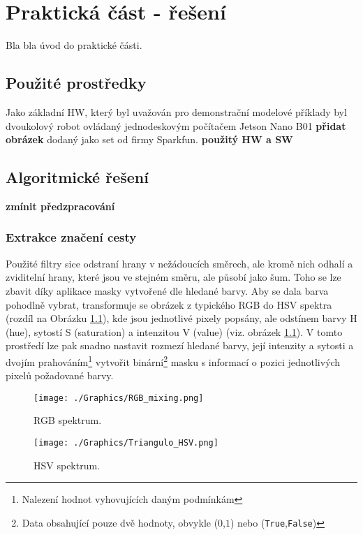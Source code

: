 \documentclass[czech, bc, kky, he, iso690numb]{fasthesis}
\begin{document}
    \chapter{Praktická část - řešení}
        Bla bla úvod do praktické části.
        \section{Použité prostředky}
            Jako základní HW, který byl uvažován pro demonstrační modelové příklady byl dvoukolový robot ovládaný jednodeskovým počítačem Jetson Nano B01 \textbf{přidat obrázek} dodaný jako set od firmy Sparkfun.
            \textbf{použitý HW a SW}
        \section{Algoritmické řešení}
        \textbf{zmínit předzpracování}
            \subsection{Extrakce značení cesty}
            	Použité filtry sice odstraní hrany v nežádoucích směrech, ale kromě nich odhalí a zviditelní hrany, které jsou ve stejném směru, ale působí jako šum. Toho se lze zbavit díky aplikace masky vytvořené dle hledané barvy. Aby se dala barva pohodlně vybrat, transformuje se obrázek z typického RGB do HSV spektra (rozdíl na Obrázku \ref{pic:HSV_spektrum}), kde jsou jednotlivé pixely popsány, ale odstínem barvy H (hue), sytostí S (saturation) a intenzitou V (value) (viz. obrázek \ref{pic:HSV_spektrum}). V tomto prostředí lze pak snadno nastavit rozmezí hledané barvy, její intenzity a sytosti a dvojím prahováním\footnote{Nalezení hodnot vyhovujících daným podmínkám} vytvořit binární\footnote{Data obsahující pouze dvě hodnoty, obvykle (\(0\),\(1\)) nebo (\verb"True",\verb"False")} masku s informací o pozici jednotlivých pixelů požadované barvy.\\
            	\begin{figure}[ht]
            		\centering
            		\texttt{[image: ./Graphics/RGB\_mixing.png]}
            		\caption{RGB spektrum.}
            	\end{figure}
            	
            	\begin{figure}[ht]
            		\centering
            		\texttt{[image: ./Graphics/Triangulo\_HSV.png]}
            		\caption{HSV spektrum.}
            		\label{pic:HSV_spektrum}
            	\end{figure}
            	
\end{document}

